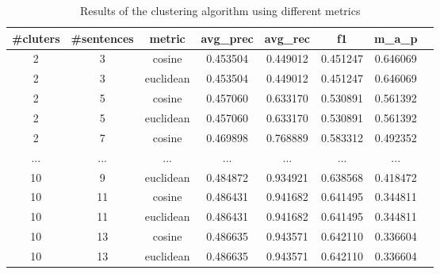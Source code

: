 \begin{table}[H]
  \centering
  \caption{Results of the clustering algorithm using different metrics}
  \label{tab:my-table}
  \begin{adjustbox}{margin={-1cm 0cm 0cm 0cm}}
    \begin{tabular}{|c|c|c|c|c|c|c|c|}
      \hline
      \textbf{\#cluters} & \textbf{\#sentences} & \textbf{metric} & \textbf{avg\_prec} & \textbf{avg\_rec} & \textbf{f1} & \textbf{m\_a\_p} \\ \hline
      2                  & 3                    & cosine          & 0.453504           & 0.449012          & 0.451247    & 0.646069         \\ \hline
      2                  & 3                    & euclidean       & 0.453504           & 0.449012          & 0.451247    & 0.646069         \\ \hline
      2                  & 5                    & cosine          & 0.457060           & 0.633170          & 0.530891    & 0.561392         \\ \hline
      2                  & 5                    & euclidean       & 0.457060           & 0.633170          & 0.530891    & 0.561392         \\ \hline
      2                  & 7                    & cosine          & 0.469898           & 0.768889          & 0.583312    & 0.492352         \\ \hline
      ...                & ...                  & ...             & ...                & ...               & ...         & ...              \\ \hline
      10                 & 9                    & euclidean       & 0.484872           & 0.934921          & 0.638568    & 0.418472         \\ \hline
      10                 & 11                   & cosine          & 0.486431           & 0.941682
                         & 0.641495             & 0.344811                                                                                  \\ \hline
      10                 & 11                   & euclidean       & 0.486431           & 0.941682          & 0.641495    & 0.344811         \\ \hline
      10                 & 13                   & cosine          & 0.486635           & 0.943571          & 0.642110    & 0.336604         \\ \hline
      10                 & 13                   & euclidean       & 0.486635           & 0.943571          & 0.642110    & 0.336604         \\ \hline
    \end{tabular}
  \end{adjustbox}
\end{table}

